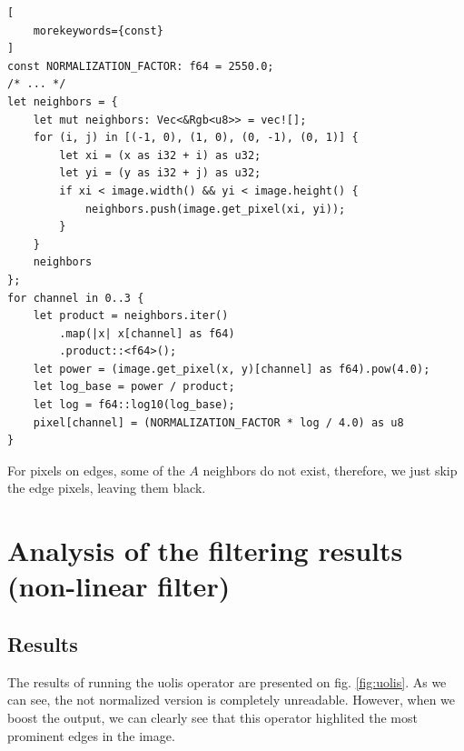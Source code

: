 \documentclass[12pt]{article}
\begin{document}
\begin{lstlisting}[
    morekeywords={const}
]
const NORMALIZATION_FACTOR: f64 = 2550.0;
/* ... */
let neighbors = {
    let mut neighbors: Vec<&Rgb<u8>> = vec![];
    for (i, j) in [(-1, 0), (1, 0), (0, -1), (0, 1)] {
        let xi = (x as i32 + i) as u32;
        let yi = (y as i32 + j) as u32;
        if xi < image.width() && yi < image.height() {
            neighbors.push(image.get_pixel(xi, yi));
        }
    }
    neighbors
};
for channel in 0..3 {
    let product = neighbors.iter()
        .map(|x| x[channel] as f64)
        .product::<f64>();
    let power = (image.get_pixel(x, y)[channel] as f64).pow(4.0);
    let log_base = power / product;
    let log = f64::log10(log_base);
    pixel[channel] = (NORMALIZATION_FACTOR * log / 4.0) as u8
}
\end{lstlisting}

For pixels on edges, some of the $A$ neighbors do not exist, therefore, we just skip the edge pixels, leaving them black.

\section{Analysis of the filtering results (non-linear filter)}
\subsection{Results}

The results of running the uolis operator are presented on fig. \ref{fig:uolis}.
As we can see, the not normalized version is completely unreadable.
However, when we boost the output,
 we can clearly see that this operator highlited the most prominent edges in the image.
\end{document}
